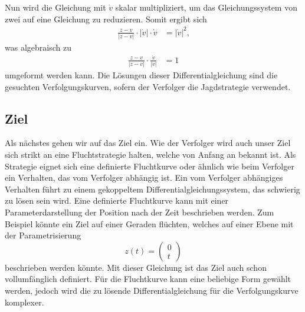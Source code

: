 Nun wird die Gleichung mit $\dot{v}$ skalar multipliziert, um das Gleichungssystem von zwei auf eine Gleichung zu reduzieren. Somit ergibt sich
\begin{align}
    \frac{z-v}{|z-v|}\cdot|\dot{v}|\cdot\dot{v}
    &=
    |\dot{v}|^2
    \text{,}
\end{align}
was algebraisch zu
\begin{align}
    \label{lambertw:pursuerDGL}
    \frac{z-v}{|z-v|}\cdot \frac{\dot{v}}{|\dot{v}|}
    &=
    1
\end{align}
umgeformt werden kann.
Die Lösungen dieser Differentialgleichung sind die gesuchten Verfolgungskurven, sofern der Verfolger die Jagdstrategie verwendet.
%
\subsection{Ziel
\label{lambertw:subsection:Ziel}}
Als nächstes gehen wir auf das Ziel ein.
Wie der Verfolger wird auch unser Ziel sich strikt an eine Fluchtstrategie halten, welche von Anfang an bekannt ist.
Als Strategie eignet sich eine definierte Fluchtkurve oder ähnlich wie beim Verfolger ein Verhalten, das vom Verfolger abhängig ist.
Ein vom Verfolger abhängiges Verhalten führt zu einem gekoppeltem Differentialgleichungssystem, das schwierig zu lösen sein wird.
Eine definierte Fluchtkurve kann mit einer Parameterdarstellung der Position nach der Zeit beschrieben werden.
Zum Beispiel könnte ein Ziel auf einer Geraden flüchten, welches auf einer Ebene mit der Parametrisierung
%
\begin{equation}
    z(t)
    =
    \begin{pmatrix}0 \\  t \end{pmatrix}
\end{equation}
%
beschrieben werden könnte.
Mit dieser Gleichung ist das Ziel auch schon vollumfänglich definiert.
Für die Fluchtkurve kann eine beliebige Form gewählt werden, jedoch wird die zu lösende Differentialgleichung für die Verfolgungskurve komplexer.




